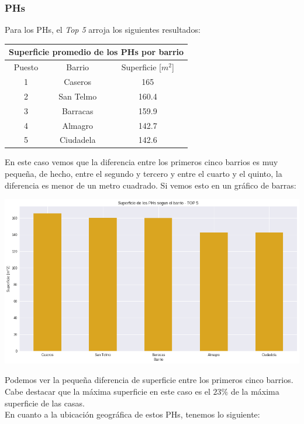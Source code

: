 \documentclass[a4paper, 10pt]{article}
\newcommand\tab[1][0.5cm]{\hspace*{#1}}
\begin{document}
				\subsubsection{PHs}
					Para los PHs, el \emph{Top 5} arroja los siguientes resultados:
					\begin{center}
						\begin{tabular}{ |c|c|c| }
							\hline
							\multicolumn{3}{|c|}{Superficie promedio de los PHs por barrio}\\
							\hline
							\hline
							Puesto & Barrio & Superficie [$m^2$]\\
							\hline
							1 & Caseros & 165\\
							2 & San Telmo & 160.4\\
							3 & Barracas & 159.9\\
							4 & Almagro & 142.7 \\
							5 & Ciudadela & 142.6\\
							\hline
						\end{tabular}
					\end{center}
					\tab En este caso vemos que la diferencia entre los primeros cinco barrios es muy pequeña, de hecho, entre el
					segundo y tercero y entre el cuarto y el quinto, la diferencia es menor de un metro cuadrado. Si vemos esto en
					un gráfico de barras:
					\begin{center}
   		    				\includegraphics[width=\textwidth]{images/phSurfaceTopBar}
				  	\end{center}
				  	\tab Podemos ver la pequeña diferencia de superficie entre los primeros cinco barrios. Cabe destacar que la
				  	máxima superficie en este caso es el $23\%$ de la máxima superficie de las casas. \\
				  	\tab En cuanto a la ubicación geográfica de estos PHs, tenemos lo siguiente:
\end{document}

